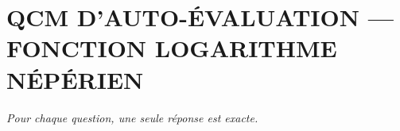 
\section*{\textcolor{chapcolor}{\MakeUppercase{QCM d'auto-évaluation — Fonction logarithme népérien}}}

\begin{center}
\textit{Pour chaque question, une seule réponse est exacte.}
\end{center}

